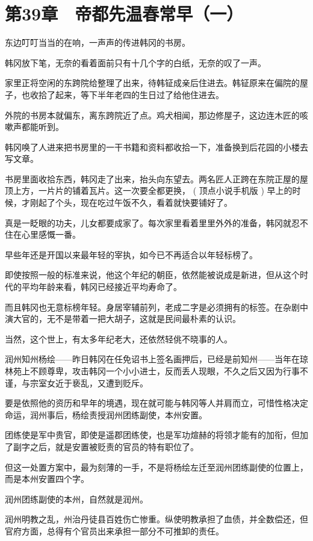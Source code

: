 \section{第39章　帝都先温春常早（一）}

东边叮叮当当的在响，一声声的传进韩冈的书房。

韩冈放下笔，无奈的看着面前只有十几个字的白纸，无奈的叹了一声。

家里正将空闲的东跨院给整理了出来，待韩钲成亲后住进去。韩钲原来在偏院的屋子，也收拾了起来，等下半年老四的生日过了给他住进去。

外院的书房本就偏东，离东跨院近了点。鸡犬相闻，那边修屋子，这边连木匠的咳嗽声都能听到。

韩冈唤了人进来把书房里的一干书籍和资料都收拾一下，准备换到后花园的小楼去写文章。

书房里面收拾东西，韩冈走了出来，抬头向东望去。两名匠人正跨在东院正屋的屋顶上方，一片片的铺着瓦片。这一次要全都更换， ( 顶点小说手机版  ) 早上的时候，才刚起了个头，现在吃过午饭不久，看着就快要铺好了。

真是一眨眼的功夫，儿女都要成家了。每次家里看着里里外外的准备，韩冈就忍不住在心里感慨一番。

早些年还是开国以来最年轻的宰执，如今已不再适合以年轻标榜了。

即使按照一般的标准来说，他这个年纪的朝臣，依然能被说成是新进，但从这个时代的平均年龄来看，韩冈已经接近平均寿命了。

而且韩冈也无意标榜年轻。身居宰辅前列，老成二字是必须拥有的标签。在杂剧中演大官的，无不是带着一把大胡子，这就是民间最朴素的认识。

当然，这个世上，有太多年纪老大，还依然轻佻不晓事的人。

润州知州杨绘——昨日韩冈在任免诏书上签名画押后，已经是前知州——当年在琼林苑上不顾尊卑，攻击韩冈一个小小进士，反而丢人现眼，不久之后又因为行事不谨，与宗室女近于亵乱，又遭到贬斥。

要是依照他的资历和早年的境遇，现在就可能与韩冈等人并肩而立，可惜性格决定命运，润州事后，杨绘责授润州团练副使，本州安置。

团练使是军中贵官，即使是遥郡团练使，也是军功煊赫的将领才能有的加衔，但加了副字之后，就是安置被贬责的官员的特有职位了。

但这一处置方案中，最为刻薄的一手，不是将杨绘左迁至润州团练副使的位置上，而是本州安置四个字。

润州团练副使的本州，自然就是润州。

润州明教之乱，州治丹徒县百姓伤亡惨重。纵使明教承担了血债，并全数偿还，但官府方面，总得有个官员出来承担一部分不可推卸的责任。

